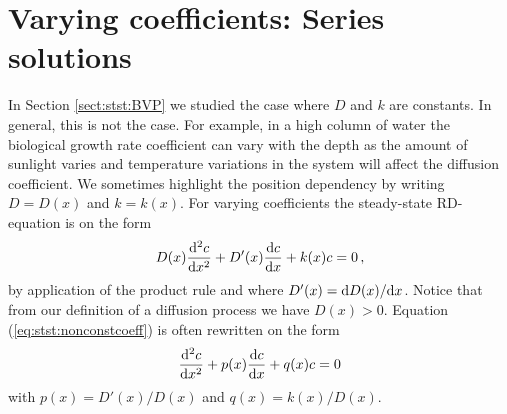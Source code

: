 \section{Varying coefficients: Series solutions \label{sec:inhomogenousstst}}
In Section \ref{sect:stst:BVP} we studied the case where $D$ and $k$ are constants. In general, this 
is not the case. For example, in a high column of water the biological growth rate coefficient can vary with the depth 
as the amount of sunlight varies and temperature variations in the system will affect the
diffusion coefficient. We sometimes highlight the position dependency by writing $D=D(x)$ and $k=k(x)$. For
varying coefficients the steady-state RD-equation is on the form   
\begin{eqnarray}
	\label{eq:stst:nonconstcoeff}
	D(x) \frac{\mathrm{d}^2c}{\mathrm{d} x^2} + D'(x) \frac{\mathrm{d} c}{\mathrm{d} x} + k(x) c = 0 \, ,
\end{eqnarray}
by application of the product rule and where $D'(x) = \mathrm{d} D(x)/\mathrm{d} x$. Notice that from our definition 
of a diffusion process we have $D(x) > 0$. Equation (\ref{eq:stst:nonconstcoeff}) is often rewritten on the form
\begin{equation}
	\frac{\mathrm{d}^2 c}{\mathrm{d} x^2} + p(x)\frac{\mathrm{d} c}{\mathrm{d} x} + q(x) c = 0
\end{equation}
with $p(x)=D'(x)/D(x)$ and $q(x)=k(x)/D(x)$. 

